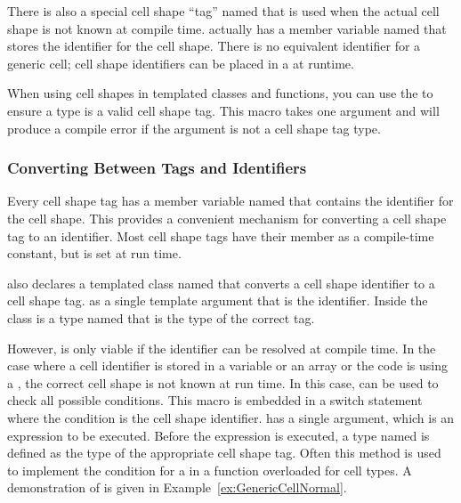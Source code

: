 There is also a special cell shape ``tag'' named 
that is used when the actual cell shape is not known at compile time.
 actually has a member variable named
 that stores the identifier for the cell shape. There is no
equivalent identifier for a generic cell; cell shape identifiers can be
placed in a  at runtime.

When using cell shapes in templated classes and functions, you can use the
 to ensure a type is a valid cell
shape tag. This macro takes one argument and will produce a compile error
if the argument is not a cell shape tag type.

\subsubsection{Converting Between Tags and Identifiers}

Every cell shape tag has a member variable named  that
contains the identifier for the cell shape. This provides a convenient
mechanism for converting a cell shape tag to an identifier. Most cell shape
tags have their  member as a compile-time constant, but
 is set at run time.

 also declares a templated class named
 that converts a cell shape identifier to a cell
shape tag.  as a single template argument
that is the identifier. Inside the class is a type named 
that is the type of the correct tag.


However,  is only viable if the identifier
can be resolved at compile time. In the case where a cell identifier is
stored in a variable or an array or the code is using a
, the correct cell shape is not known
at run time. In this case,  can be
used to check all possible conditions. This macro is embedded in a switch
statement where the condition is the cell shape identifier.
 has a single argument, which is an
expression to be executed. Before the expression is executed, a type named
 is defined as the type of the appropriate cell
shape tag. Often this method is used to implement the condition for a
 in a function overloaded for cell
types. A demonstration of  is given in
Example~\ref{ex:GenericCellNormal}.

